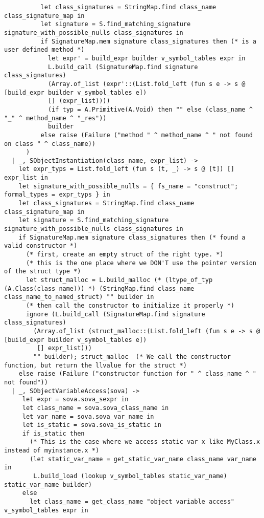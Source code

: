 \documentclass{article}
\begin{document}
\begin{verbatim}
          let class_signatures = StringMap.find class_name class_signature_map in
          let signature = S.find_matching_signature signature_with_possible_nulls class_signatures in
          if SignatureMap.mem signature class_signatures then (* is a user defined method *)
            let expr' = build_expr builder v_symbol_tables expr in
            L.build_call (SignatureMap.find signature class_signatures)
            (Array.of_list (expr'::(List.fold_left (fun s e -> s @ [build_expr builder v_symbol_tables e])
            [] (expr_list))))
            (if typ = A.Primitive(A.Void) then "" else (class_name ^ "_" ^ method_name ^ "_res"))
            builder
          else raise (Failure ("method " ^ method_name ^ " not found on class " ^ class_name))
      )
  | _, SObjectInstantiation(class_name, expr_list) ->
    let expr_typs = List.fold_left (fun s (t, _) -> s @ [t]) [] expr_list in
    let signature_with_possible_nulls = { fs_name = "construct"; formal_types = expr_typs } in
    let class_signatures = StringMap.find class_name class_signature_map in
    let signature = S.find_matching_signature signature_with_possible_nulls class_signatures in
    if SignatureMap.mem signature class_signatures then (* found a valid constructor *)
      (* first, create an empty struct of the right type. *)
      (* this is the one place where we DON'T use the pointer version of the struct type *)
      let struct_malloc = L.build_malloc (* (ltype_of_typ (A.Class(class_name))) *) (StringMap.find class_name class_name_to_named_struct) "" builder in
      (* then call the constructor to initialize it properly *)
      ignore (L.build_call (SignatureMap.find signature class_signatures)
        (Array.of_list (struct_malloc::(List.fold_left (fun s e -> s @ [build_expr builder v_symbol_tables e])
         [] expr_list)))
        "" builder); struct_malloc  (* We call the constructor function, but return the llvalue for the struct *)
    else raise (Failure ("constructor function for " ^ class_name ^ " not found"))
  | _, SObjectVariableAccess(sova) ->
     let expr = sova.sova_sexpr in
     let class_name = sova.sova_class_name in
     let var_name = sova.sova_var_name in
     let is_static = sova.sova_is_static in
     if is_static then
       (* This is the case where we access static var x like MyClass.x instead of myinstance.x *)
       (let static_var_name = get_static_var_name class_name var_name in
        L.build_load (lookup v_symbol_tables static_var_name) static_var_name builder)
     else
       let class_name = get_class_name "object variable access" v_symbol_tables expr in

\end{verbatim}
\end{document}
